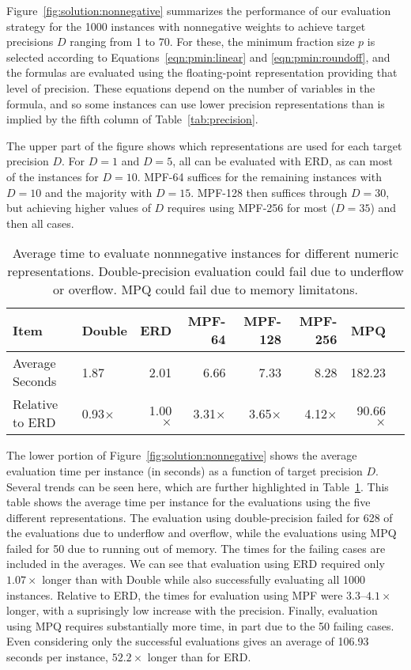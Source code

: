 \documentclass{easychair}
\begin{document}
Figure~\ref{fig:solution:nonnegative} summarizes the performance of
our evaluation strategy for the 1000 instances with nonnegative weights to achieve target
precisions $D$ ranging from 1 to 70.  For these, the minimum fraction
size $p$ is selected according to Equations~\ref{eqn:pmin:linear} and
\ref{eqn:pmin:roundoff}, and the formulas are evaluated using the
floating-point representation providing that level of precision.
These equations depend on the number of variables in the formula, and so some
instances can use lower precision representations than is implied by
the fifth column of Table~\ref{tab:precision}.

The upper part of the figure shows which representations are used for each target precision $D$.
For $D=1$ and $D=5$, all can be evaluated with ERD, as can most of the instances for $D=10$.
MPF-64 suffices for the remaining instances with $D=10$ and the majority with $D=15$.  MPF-128 then suffices through $D=30$,
but achieving higher values of $D$ requires using MPF-256 for most ($D=35$) and then all cases.

\begin{table}
  \caption{Average time to evaluate nonnnegative instances for different numeric representations.
  Double-precision evaluation could fail due to underflow or overflow.  MPQ could fail due to memory limitatons.}
  \label{tab:nonneg:perf}
\begin{center}
    \begin{tabular}{llrrrrrr}
      \toprule
Item &        Double & ERD & MPF-64 & MPF-128 & MPF-256 & MPQ \\
      \midrule
Average Seconds & 1.87 & 2.01 & 6.66 & 7.33 & 8.28 & 182.23 \\
Relative to ERD & 0.93$\times$ & 1.00$\times$ & 3.31$\times$ & 3.65$\times$ & 4.12$\times$ & 90.66$\times$ \\
      \bottomrule
    \end{tabular}
\end{center}
\end{table}

The lower portion of Figure~\ref{fig:solution:nonnegative} shows the
average evaluation time per instance (in seconds) as a function of
target precision $D$.  Several trends can be seen here, which are
further highlighted in Table~\ref{tab:nonneg:perf}.  This table shows
the average time per instance for the evaluations using the five
different representations.  The evaluation using double-precision
failed for 628 of the evaluations due to underflow and overflow, while
the evaluations using MPQ failed for 50 due to running out of memory.
The times for the failing cases are included in the averages.  We can
see that evaluation using ERD required only $1.07\times$ longer than
with Double while also successfully evaluating all 1000 instances.
Relative to ERD, the times for evaluation using MPF were
$3.3$--$4.1\times$ longer, with a suprisingly low increase with the
precision.  Finally, evaluation using MPQ requires substantially more
time, in part due to the 50 failing cases.  Even considering only the
successful evaluations gives an average of 106.93 seconds per instance, $52.2\times$ longer than for ERD\@.
\end{document}
